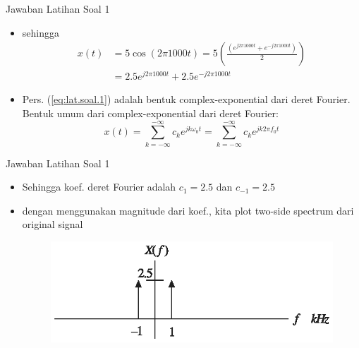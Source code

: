 \documentclass[pdflatex,compress,mathserif]{beamer}
\begin{document}
\begin{frame}{Jawaban Latihan Soal 1}
    \begin{itemize}
        \item sehingga
        \begin{align}
            x(t) &= 5 \cos (2 \pi 1000 t) = 5 \left( \frac{(e^{j2\pi 1000t} + e^{-j2\pi 1000t})}{2} \right) \\
            &= 2.5 e^{j2 \pi 1000t} + 2.5 e^{-j2 \pi 1000t}
            \label{eq:lat.soal.1}
        \end{align}
        \item Pers. (\ref{eq:lat.soal.1}) adalah bentuk complex-exponential dari deret Fourier. Bentuk umum dari complex-exponential dari deret Fourier:
        \begin{equation*}
            x(t) = \sum_{k=-\infty}^{-\infty} c_k e^{jk\omega_0 t} = \sum_{k=-\infty}^{-\infty} c_k e^{jk 2\pi f_0 t}
        \end{equation*}
    \end{itemize}
\end{frame}

\begin{frame}{Jawaban Latihan Soal 1}
    \begin{itemize}
        \item Sehingga koef. deret Fourier adalah $c_1 = 2.5$ dan $c_{-1} = 2.5$
        \item dengan menggunakan magnitude dari koef., kita plot two-side spectrum dari original signal
        \begin{figure}
            \includegraphics[width=\linewidth]{./img/img12}
        \end{figure}
    \end{itemize}
\end{frame}
\end{document}
